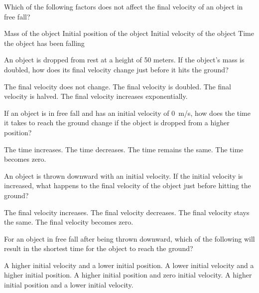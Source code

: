\documentclass[../main-physics-problems.tex]{subfiles}
\begin{document}
\begin{questions}
\question
Which of the following factors does not affect the final velocity of an object in free fall?

\begin{randomizechoices}
\correctchoice Mass of the object
\choice Initial position of the object
\choice Initial velocity of the object
\choice Time the object has been falling
\end{randomizechoices}

\question
An object is dropped from rest at a height of 50 meters. If the object’s mass is doubled, how does its final velocity change just before it hits the ground?

\begin{randomizechoices}
\correctchoice The final velocity does not change.
\choice The final velocity is doubled.
\choice The final velocity is halved.
\choice The final velocity increases exponentially.
\end{randomizechoices}

\question
If an object is in free fall and has an initial velocity of \SI{0}{m/s}, how does the time it takes to reach the ground change if the object is dropped from a higher position?

\begin{randomizechoices}
\correctchoice The time increases.
\choice The time decreases.
\choice The time remains the same.
\choice The time becomes zero.
\end{randomizechoices}


\question
An object is thrown downward with an initial velocity. If the initial velocity is increased, what happens to the final velocity of the object just before hitting the ground?

\begin{randomizechoices}
\correctchoice The final velocity increases.
\choice The final velocity decreases.
\choice The final velocity stays the same.
\choice The final velocity becomes zero.
\end{randomizechoices}

\question
For an object in free fall after being thrown downward, which of the following will result in the shortest time for the object to reach the ground?

\begin{randomizechoices}
\correctchoice A higher initial velocity and a lower initial position.
\choice A lower initial velocity and a higher initial position.
\choice A higher initial position and zero initial velocity.
\choice A higher initial position and a lower initial velocity.
\end{randomizechoices}
\end{questions}
\end{document}
